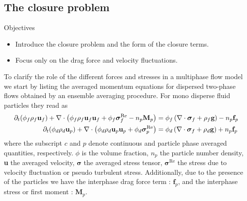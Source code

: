 \subsection{The closure problem}
Objectives
\begin{itemize}
    \item Introduce the closure problem and the form of the closure terms. 
    \item Focus only on the drag force and velocity fluctuations. 
\end{itemize}
To clarify the role of the different forces and stresses in a multiphase flow model we start by listing the averaged momentum equations for dispersed two-phase flows obtained by an ensemble averaging procedure.
For mono disperse fluid particles they read as \citep{zhang1997momentum,jackson1997locally}
\begin{align}
    \partial_t (\phi_f\rho_f \textbf{u}_f)
    + \mathbf{\nabla}\cdot \left(\phi_f\rho_f \textbf{u}_f\textbf{u}_f + \phi_f  \bm{\sigma}_f^{\text{Re}} - n_p\textbf{M}_p \right)
    &= \phi_f 
    \left(\mathbf{\nabla}\cdot \bm{\sigma}_f
    + \rho_f \textbf{g}\right)
    - n_p \textbf{f}_p 
    \label{eq:dt_uc}
    \\
    \partial_t (\phi_d\rho_d \textbf{u}_p)
    + \mathbf{\nabla}\cdot \left(\phi_d\rho_d \textbf{u}_p\textbf{u}_p+ \phi_d \bm{\sigma}_p^{\text{Re}}\right)
    &= 
    \phi_d \left(\mathbf{\nabla}\cdot \bm{\sigma}_f
    + \rho_d \textbf{g}\right)
    + n_p \textbf{f}_p 
    \label{eq:dy_up}
\end{align}
where the subscript $c$ and $p$ denote continuous and particle phase averaged quantities, respectively.
$\phi$ is the volume fraction, $n_p$ the particle number density, \textbf{u} the averaged velocity, $\bm{\sigma}$ the averaged stress tensor, $\bm{\sigma}^{\text{Re}}$ the stress due to velocity fluctuation or pseudo turbulent stress.
Additionally, due to the presence of the particles we have the interphase drag force term : $\textbf{f}_p$, and the interphase stress or first moment : $\textbf{M}_p$. 


